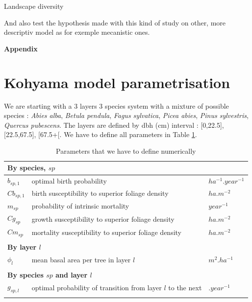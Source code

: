 \documentclass{article}
\begin{document}
Landscape diversity

And also test the hypothesis made with this kind of study on other, more descriptiv model as for exemple mecanistic ones.

\clearpage

\printbibliography

\clearpage


\begin{center}
    \textbf{\Large Appendix}
\end{center}

\appendix

\section{Kohyama model parametrisation}

We are starting with a 3 layers 3 species system with a mixture of possible species : \textit{Abies alba}, \textit{Betula pendula}, \textit{Fagus sylvatica}, \textit{Picea abies}, \textit{Pinus sylvestris}, \textit{Quercus pubescens}. The layers are defined by dbh (cm) interval : [0,22.5], [22.5,67.5], [67.5+[. We have to define all parameters in Table \ref{tab:coeftoparam}.

\begin{table}[H]
    \centering
    \begin{tabular}{l l l}
    \hline
    \hline
    \multicolumn{3}{l}{\textbf{By species}, $sp$} \\
    \hline
    $b_{sp,1}$     & optimal birth probability                              & $ha^{-1}.year^{-1}$ \\
    $Cb_{sp,1}$    & birth susceptibility to superior foliage density       & $ha.m^{-2}$       \\
    $m_{sp}$       & probability of intrinsic mortality                     & $year^{-1}$ \\
    $Cg_{sp}$      & growth susceptibility to superior foliage density      & $ha.m^{-2}$           \\
    $Cm_{sp}$      & mortality susceptibility to superior foliage density   & $ha.m^{-2}$           \\    
    \\
    \multicolumn{3}{l}{\textbf{By layer $l$}} \\
    \hline
    $\phi_{l}$  & mean basal area per tree in layer $l$        & $m^{2}.ha^{-1}$  \\
    \\
    \multicolumn{3}{l}{\textbf{By species $sp$ and layer $l$}} \\
    \hline
    $g_{sp,l}$     & optimal probability of transition from layer $l$ to the next & $.year^{-1}$ \\
    \\
    \hline
    \hline
    \end{tabular}
    \caption{Parameters that we have to define numerically}
    \label{tab:coeftoparam} 
\end{table}
\end{document}
